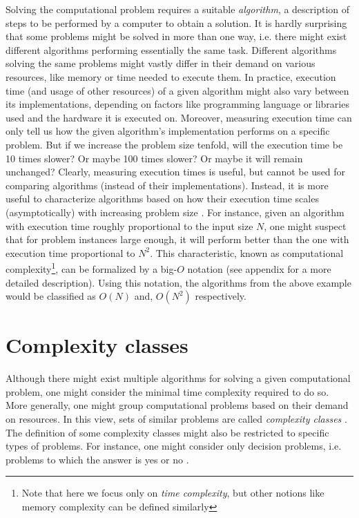 Solving the computational problem requires a suitable \emph{algorithm}, a description of steps to be
performed by a computer to obtain a solution. It is hardly surprising that some problems might be
solved in more than one way, i.e. there might exist different algorithms performing essentially the
same task. Different algorithms solving the same problems might vastly differ in their demand on
various resources, like memory or time needed to execute them. In practice, execution time (and
usage of other resources) of a given algorithm might also vary between its implementations,
depending on factors like programming language or libraries used and the hardware it is executed on. Moreover, measuring execution time can only tell us how the given algorithm's implementation performs on a specific problem. But if we increase the problem size tenfold, will the execution time be 10 times slower? Or maybe 100 times slower? Or maybe it will remain unchanged? Clearly, measuring execution times is useful, but cannot be used for comparing algorithms (instead of their implementations). Instead, it is more useful to characterize algorithms based on how their execution
time scales (asymptotically) with increasing problem size \cite{arora}. For instance, given an
algorithm with execution time roughly proportional to the input size $N$, one might suspect that for
problem instances large enough, it will perform better than the one with execution time proportional
to $N^{2}$. This characteristic, known as computational complexity\footnote{Note that here we focus
only on \emph{time complexity}, but other notions like memory complexity can be defined similarly},
can be formalized by a big-$O$ notation (see appendix for a more detailed description). Using this
notation, the algorithms from the above example would be classified as $O(N)$ and, $O(N^{2})$
respectively.

\section{Complexity classes}
Although there might exist multiple algorithms for solving a given computational problem, one might
consider the minimal time complexity required to do so. More generally, one might group
computational problems based on their demand on resources. In this view, sets of similar problems
are called \emph{complexity classes} \cite{arora}. The definition of some complexity classes might
also be restricted to specific types of problems. For instance, one might consider only decision
problems, i.e. problems to which the answer is yes or no \cite{arora}.

